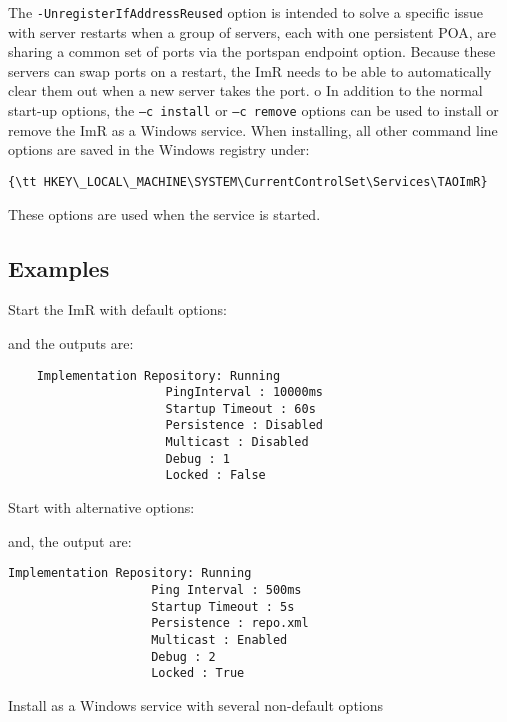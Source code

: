 The {\tt -UnregisterIfAddressReused} option is intended to solve a specific issue with server restarts
when a group of servers, each with one persistent POA, are sharing a common set of ports via the
portspan endpoint option. Because these servers can swap ports on a restart, the ImR needs to be able
to automatically clear them out when a new server takes the port.
o
In addition to the normal start-up options, the {\tt–c install} or {\tt–c remove} options can be used to
install or remove the ImR as a Windows service. When installing, all other command line options are
saved in the Windows registry under:

\small{
\begin{verbatim}
{\tt HKEY\_LOCAL\_MACHINE\SYSTEM\CurrentControlSet\Services\TAOImR}
\end{verbatim}
}

These options are used when the service is started.

\subsection{Examples}

Start the ImR with default options:


and the outputs are:

\begin{verbatim}
    Implementation Repository: Running
                      PingInterval : 10000ms
                      Startup Timeout : 60s
                      Persistence : Disabled
                      Multicast : Disabled
                      Debug : 1
                      Locked : False
\end{verbatim}

Start with alternative options:


and, the output are:

\begin{verbatim}
Implementation Repository: Running
                    Ping Interval : 500ms
                    Startup Timeout : 5s
                    Persistence : repo.xml
                    Multicast : Enabled
                    Debug : 2
                    Locked : True
\end{verbatim}

Install as a Windows service with several non-default options

